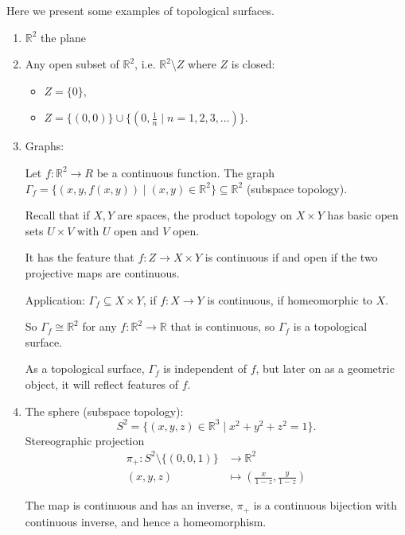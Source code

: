 \begin{eg}
    Here we present some examples of topological surfaces.
    \begin{enumerate}
        \item \(\mathbb{R}^2\) the plane
        \item Any open subset of \(\mathbb{R}^2\), i.e. \(\mathbb{R}^2 \setminus Z\) where \(Z\) is closed:
        \begin{itemize}
            \item \(Z = \{0\}\),
            \item \(Z = \{(0,0)\}\cup \{(0,\frac{1}{n}\mid n = 1,2,3, \ldots )\}\).
        \end{itemize}
        \item Graphs:

        Let \(f: \mathbb{R}^2 \to R\) be a continuous function. The graph \(\Gamma_f = \{(x,y,f(x, y))\mid (x,y) \in \mathbb{R}^2\} \subseteq \mathbb{R}^2\) (subspace topology).

        Recall that if \(X, Y\) are spaces, the product topology on \(X \times Y\) has basic open sets \(U \times V\) with \(U\) open and \(V\) open.

        It has the feature that \(f: Z \to  X \times Y\) is continuous if and open if the two projective maps are continuous.

        Application: \(\Gamma_f \subseteq X \times Y \), if \(f: X \to Y\) is continuous, if homeomorphic to \(X\).

        So \(\Gamma_f \cong \mathbb{R}^2\) for any \(f: \mathbb{R}^2 \to \mathbb{R}\) that is continuous, so \(\Gamma_f\) is a topological surface.

        \begin{note}
            As a topological surface, \(\Gamma_f\) is independent of \(f\), but later on as a geometric object, it will reflect features of \(f\). 
        \end{note}
        \item The sphere (subspace topology):
        \[
            S^2 = \{(x,y,z) \in \mathbb{R}^3 \mid x^2 + y^2 + z^2 = 1\}.
        \]
        Stereographic projection
        \begin{align*}
            \pi_+: S^2 \setminus \{(0,0,1)\} &\to \mathbb{R}^2\\
            (x,y,z) &\mapsto (\frac{x}{1-z}, \frac{y}{1 - z})
        \end{align*}
        \begin{note}
            The map is continuous and has an inverse,
            \(\pi_+\) is a continuous bijection with continuous inverse, and hence a homeomorphism.


\end{note}
\end{enumerate}
\end{eg}
